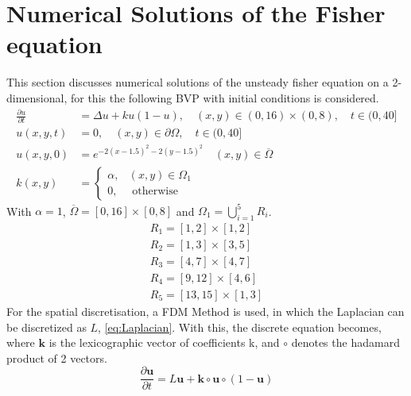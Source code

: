 \documentclass{article}
\begin{document}
\section{Numerical Solutions of the Fisher equation}
This section discusses numerical solutions of the unsteady fisher equation on a 2-dimensional, for this the following BVP with initial conditions is considered.
\begin{equation}
\begin{aligned} \frac{\partial u}{\partial t} &=\Delta u+k u(1-u), \quad(x, y) \in(0,16) \times(0,8), \quad t \in(0,40] \\ u(x, y, t) &=0, \quad(x, y) \in \partial \Omega, \quad t \in(0,40] \\ u(x, y, 0) &=e^{-2(x-1.5)^{2}-2(y-1.5)^{2}} \quad(x, y) \in \overline{\Omega} \\ k(x, y) &=\left\{\begin{array}{ll}{\alpha,} & {(x, y) \in \Omega_{1}} \\ {0,} & {\text { otherwise }}\end{array}\right.\end{aligned}
\end{equation}
With $\alpha = 1$, $\overline{\Omega} = \left[0,16\right]\times\left[0,8\right]$ and $\Omega_1 = \bigcup\limits_{i=1}^{5} R_{i}$.
\begin{equation}
\begin{array}{l}{R_{1}=[1,2] \times[1,2]} \\ {R_{2}=[1,3] \times[3,5]} \\ {R_{3}=[4,7] \times[4,7]} \\ {R_{4}=[9,12] \times[4,6]} \\ {R_{5}=[13,15] \times[1,3]}\end{array}
\end{equation}
For the spatial discretisation, a FDM Method is used, in which the Laplacian can be discretized as $L$, \autoref{eq:Laplacian}. With this, the discrete equation becomes, where $\mathbf{k}$ is the lexicographic vector of coefficients k, and $\circ$ denotes the hadamard product of 2 vectors.
\begin{equation}
\frac{\partial \mathbf{u}}{\partial t} = L \mathbf{u} + \mathbf{k}\circ\mathbf{u}\circ(1-\mathbf{u})
\end{equation}
\end{document}
